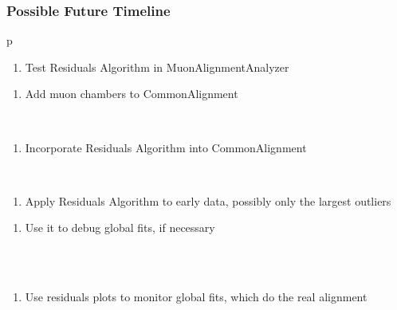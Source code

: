 \documentclass[12pt,compress]{beamer}
\begin{document}
\begin{frame}
\frametitle{Possible Future Timeline}

\renewcommand{\arraystretch}{3.3}
\begin{tabular}{p\linewidth}
  \begin{minipage}{0.55\linewidth}
    \begin{enumerate}
    \item Test Residuals Algorithm in MuonAlignmentAnalyzer
    \end{enumerate}
  \end{minipage}
  \begin{minipage}{0.43\linewidth}
    \begin{enumerate}
    \item Add muon chambers to CommonAlignment
    \end{enumerate}
  \end{minipage} \\
  \begin{minipage}{\linewidth}
    \begin{enumerate}
      \addtocounter{enumi}{1}
    \item Incorporate Residuals Algorithm into CommonAlignment
    \end{enumerate}
  \end{minipage} \\
  \begin{minipage}{0.55\linewidth}
    \begin{enumerate}
      \addtocounter{enumi}{2}
    \item Apply Residuals Algorithm to early data, possibly only the largest outliers
    \end{enumerate}
  \end{minipage}
  \begin{minipage}{0.43\linewidth}
    \begin{enumerate}
      \addtocounter{enumi}{2}
    \item Use it to debug global fits, if necessary \\ \mbox{ }
    \end{enumerate}
  \end{minipage} \\
  \begin{minipage}{\linewidth}
    \begin{enumerate}
      \addtocounter{enumi}{3}
    \item Use residuals plots to monitor global fits, which do the real alignment
    \end{enumerate}
  \end{minipage}
\end{tabular}
\label{numpages}
\end{frame}
\end{document}
